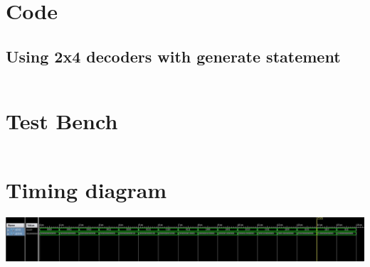 \documentclass[titlepage]{article}
\begin{document}
    \section{Code}
    \subsection{Using 2x4 decoders with generate statement}
    \inputminted{vhdl}{./codes/a3_ax1.vhd}
    \section{Test Bench}
    \inputminted{vhdl}{./codes/tb_a3_ax1.vhd}
    \section{Timing diagram}
    \includegraphics[width=19cm]{./figures/td_4x16.jpeg}
\end{document}
